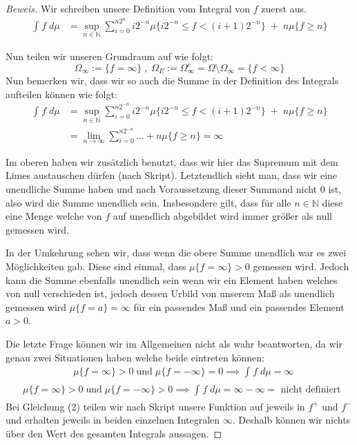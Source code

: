 \documentclass[10pt]{article}
\begin{document}
\begin{proof}[Beweis]
	Wir schreiben unsere Definition vom Integral von $f$ zuerst aus.
	\begin{align*}
		\int_{}^{} f \; d\mu &= \sup_{n \in \mathbb{N} } \sum_{i=0}^{n 2 ^{n}}
		i 2 ^{-n} \mu \{
			i 2 ^{-n} \leq f < (i+1) 2 ^{-n}
		\} \; + \; n \mu \{
			f \geq n
		\} 
	\end{align*}

	Nun teilen wir unseren Grundraum auf wie folgt:
	\[
	\Omega_\infty := \{
		f = \infty
	\}  \; , \;
	\Omega_E := \Omega_\infty ^{c}
	= \Omega \setminus \Omega_\infty
	= \{
		f < \infty
	\} 
	\] 
	Nun bemerken wir, dass wir so auch die Summe in der Definition des Integrals
	aufteilen können wie folgt:
	\begin{align*}
		\int_{}^{} f \; d\mu &= 
		\sup_{n \in \mathbb{N} } \sum_{i=0}^{n 2 ^{-n}} i 2 ^{-n}
		\mu \{
			i 2 ^{-n} \leq f < (i+1) 2 ^{-n}
		\} \; + \; n \mu \{
			f \geq n
		\} \\
		 &= \lim_{n \to \infty} \sum_{i=0}^{n 2 ^{ -n }} ... +
		 n \mu \{
		 	f \geq n
		 \} = \infty
	\end{align*}

	Im oberen haben wir zusätzlich benutzt, dass wir hier das Supremum mit dem
	Limes austauschen dürfen (nach Skript). Letztendlich sieht man, dass
	wir eine unendliche Summe haben und nach Voraussetzung dieser Summand
	nicht 0 ist, also wird die Summe unendlich sein. Insbesondere gilt, dass
	für alle $n \in \mathbb{N} $ diese eine Menge welche von $f$ auf unendlich
	abgebildet wird immer größer als null gemessen wird.


	In der Umkehrung sehen wir, dass wenn die obere Summe unendlich war es zwei
	Möglichkeiten gab. Diese sind einmal, dass $\mu \{
		f = \infty
	\} > 0$ gemessen wird. Jedoch kann die Summe ebenfalls unendlich sein wenn
	wir ein Element haben welches von null verschieden ist, jedoch dessen Urbild
	von unserem Maß als unendlich gemessen wird $\mu \{
		f = a
	\} = \infty$ für ein passendes Maß und ein passendes Element $a > 0$.


	Die letzte Frage können wir im Allgemeinen nicht als wahr beantworten, da
	wir genau zwei Situationen haben welche beide eintreten können:
	\begin{eqnarray}
		&\mu \{
			f = \infty
		\} > 0 \; \text{und} \;
		\mu \{
			f = - \infty
		\} = 0 \implies \int_{}^{} f \; d\mu = \infty
	\end{eqnarray}
	\begin{eqnarray}
		&\mu \{
			f = \infty
		\} > 0 \; \text{und} \;
		\mu \{
			f = - \infty
		\} > 0 \implies \int_{}^{} f \; d\mu = \infty - \infty
		= \text{ nicht definiert }
	\end{eqnarray}
	Bei Gleichung (2) teilen wir nach Skript unsere Funktion auf jeweils in
	$f ^{+}$  und $f ^{-}$ und erhalten jeweils in beiden einzelnen Integralen
	$\infty$. Deshalb können wir nichts über den Wert des gesamten Integrals
	aussagen.
\end{proof}
\end{document}
